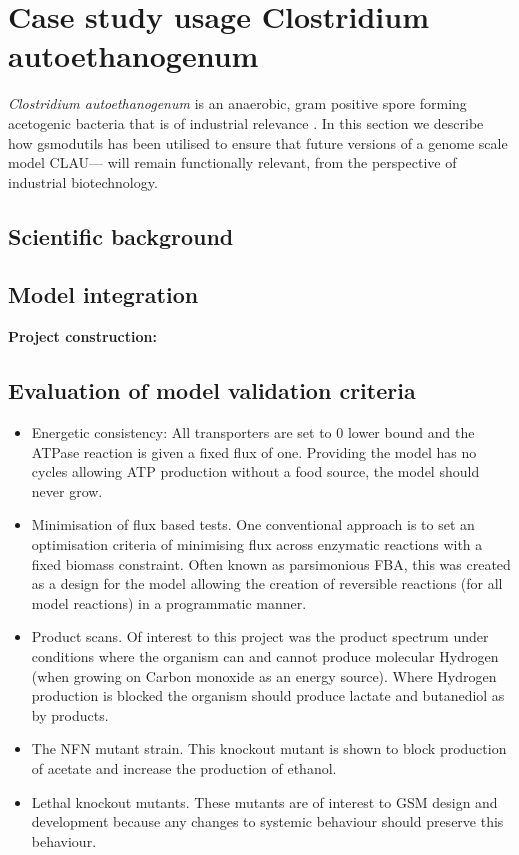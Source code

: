 \documentclass[a4paper,10pt]{article}
\begin{document}
\section{Case study usage Clostridium autoethanogenum}
\textit{Clostridium autoethanogenum} is an anaerobic, gram positive spore forming acetogenic bacteria that is of industrial relevance \cite{}.
In this section we describe how gsmodutils has been utilised to ensure that future versions of a genome scale model CLAU--- will remain functionally relevant, from the perspective of industrial biotechnology.

\subsection{Scientific background}

\subsection{}

\subsection{Model integration}
\textbf{Project construction:}


\subsection{Evaluation of model validation criteria}

\begin{itemize}
 \item Energetic consistency: All transporters are set to 0 lower bound and the ATPase reaction is given a fixed flux of one.
 Providing the model has no cycles allowing ATP production without a food source, the model should never grow.
 
 \item Minimisation of flux based tests. One conventional approach is to set an optimisation criteria of minimising flux across enzymatic reactions with a fixed biomass constraint.
 Often known as parsimonious FBA, this was created as a design for the model allowing the creation of reversible reactions (for all model reactions) in a programmatic manner.
 
 \item Product scans. Of interest to this project was the product spectrum under conditions where the organism can and cannot produce molecular Hydrogen (when growing on Carbon monoxide as an energy source).
 Where Hydrogen production is blocked the organism should produce lactate and butanediol as by products.
 
 \item The NFN mutant strain. This knockout mutant is shown to block production of acetate and increase the production of ethanol.
 
 \item Lethal knockout mutants. These mutants are of interest to GSM design and development because any changes to systemic behaviour should preserve this behaviour.
\end{itemize}
\end{document}
